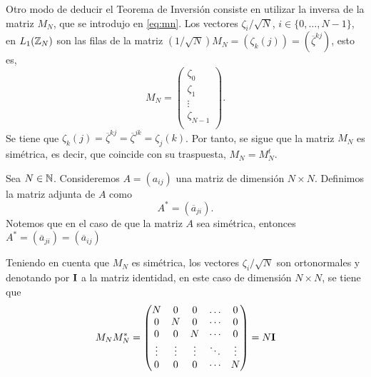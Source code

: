 \documentclass{article}
\begin{document}

Otro modo de deducir el Teorema de Inversión consiste en utilizar la inversa de la matriz $M_N$, que se introdujo en \eqref{eq:mn}. 
Los vectores $ \zeta_i / \sqrt{N}$, $i\in\{0, \dots , N-1\}$, en $L_1(\mathbb{Z}_N)$ son las filas de la matriz $\left( 1 / \sqrt{N} \right) M_N = ( \zeta_k (j) ) = (\overline{ \zeta}^{kj} )$, esto es,
\[
    M_{N} = \begin{pmatrix}
     \zeta_0 \\
     \zeta_1 \\
    \vdots \\
     \zeta_{N-1} \\
    \end{pmatrix}.
\]
Se tiene que $ \zeta_k(j) = \overline{ \zeta}^{kj} = \overline{ \zeta}^{jk} =  \zeta_j(k)$. Por tanto, se sigue que la matriz $M_N$ es simétrica, es decir, que coincide con su traspuesta, $M_N = M_N^t$.
\begin{definition}
    Sea $N\in \mathbb{N}$. Consideremos $A = (a_{ij}) $ una matriz de dimensión $N\times N$. Definimos la matriz adjunta de $A$ como
    \[
        A^{\ast} = (\overline{a}_{ji}).
    \]
    Notemos que en el caso de que la matriz $A$ sea simétrica, entonces $A^{\ast} = (\overline{a}_{ji}) = (\overline{a}_{ij}) $
\end{definition}
Teniendo en cuenta que $M_N$ es simétrica, los vectores $ \zeta_i / \sqrt{N}$ son ortonormales y denotando por ${\bf I}$ a la matriz identidad, en este caso de dimensión $N\times N$, se tiene que
\[
    M_N M_N^* = \begin{pmatrix}
    N & 0 & 0 & \dots & 0 \\
    0 & N & 0 & \cdots & 0 \\
    0 & 0 & N & \cdots & 0 \\
    \vdots & \vdots & \vdots & \ddots & \vdots \\
    0 & 0 & 0 & \cdots & N \\
    \end{pmatrix} = N{\bf I}
\]
\end{document}
